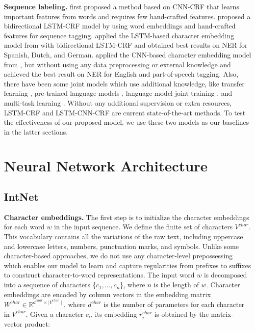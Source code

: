 \documentclass[11pt,a4paper]{article}
\begin{document}
\textbf{Sequence labeling.} \citet{collobert2011natural} first proposed a method based on CNN-CRF that learns important features from words and requires few hand-crafted features. \citet{huang2015bidirectional} proposed a bidirectional LSTM-CRF model by using word embeddings and hand-crafted features for sequence tagging. \citet{lample2016neural} applied the LSTM-based character embedding model from \citet{ling2015finding} with bidirectional LSTM-CRF and obtained best results on NER for Spanish, Dutch, and German. \citet{ma2016end} applied the CNN-based character embedding model from \citet{chiu2015named}, but without using any data preprocessing or external knowledge and achieved the best result on NER for English and part-of-speech tagging. Also, there have been some joint models which use additional knowledge, like transfer learning \cite{yang2017transfer}, pre-trained language models \cite{peters2017semisupervised}, language model joint training \cite{rei2017semisupervised}, and multi-task learning \cite{liu2017empower}. Without any additional supervision or extra resources, LSTM-CRF \cite{lample2016neural} and LSTM-CNN-CRF \cite{ma2016end} are current state-of-the-art methods. To test the effectiveness of our proposed model, we use these two models as our baselines in the latter sections.
 
\section{Neural Network Architecture}
\label{sec:architecture}

\subsection{IntNet}

\textbf{Character embeddings.} The first step is to initialize the character embeddings for each word $w$ in the input sequence. We define the finite set of characters $V^{char}$. This vocabulary contains all the variations of the raw text, including uppercase and lowercase letters, numbers, punctuation marks, and symbols. Unlike some character-based approaches, we do not use any character-level prepossessing which enables our model to learn and capture regularities from prefixes to suffixes to construct character-to-word representations. The input word $w$ is decomposed into a sequence of characters \{$c_1, . . . , c_n$\}, where $n$ is the length of $w$. Character embeddings are encoded by column vectors in the embedding matrix $W^{char} \in \mathbb{R}^{d^{char} \times \mid V^{char} \mid}$, where $d^{char}$ is the number of parameters for each character in $V^{char}$. Given a character $c_i$, its embedding $r^{char}_i$ is obtained by the matrix-vector product:
\end{document}
